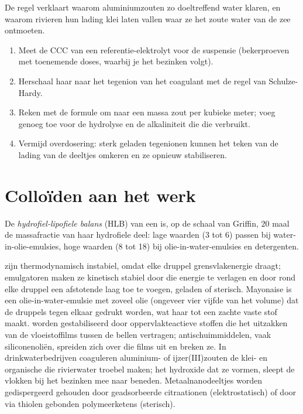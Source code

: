 De regel verklaart waarom aluminiumzouten zo doeltreffend water klaren,
en waarom rivieren hun lading klei laten vallen waar ze het zoute water
van de zee ontmoeten.

\begin{method}\label{met:b3:colloids:coagulant-dose}
\begin{enumerate}
  \item Meet de CCC van een referentie-elektrolyt voor de suspensie
        (bekerproeven met toenemende doses, waarbij je het bezinken
        volgt).
  \item Herschaal haar naar het tegenion van het coagulant met de regel
        van Schulze-Hardy.
  \item Reken met de formule om naar een massa zout per kubieke meter;
        voeg genoeg toe voor de hydrolyse en de alkaliniteit die die
        verbruikt.
  \item Vermijd overdosering: sterk geladen tegenionen kunnen het teken
        van de lading van de deeltjes omkeren en ze opnieuw
        stabiliseren.
\end{enumerate}
\end{method}

\section{Colloïden aan het werk}

\begin{definition}\label{def:b3:colloids:hlb}
De \emph{hydrofiel-lipofiele balans}
(HLB) van een  is, op de schaal van
Griffin, $20$ maal de
massafractie van haar hydrofiele deel: lage waarden (3 tot 6) passen bij
water-in-olie-emulsies, hoge waarden (8 tot 18) bij olie-in-water-emulsies
en detergenten.
\end{definition}

 zijn thermodynamisch instabiel, omdat elke druppel
grensvlakenergie draagt; emulgatoren maken ze kinetisch stabiel door die
energie te verlagen en door rond elke druppel een afstotende laag toe te
voegen, geladen of sterisch. Mayonaise is een olie-in-water-emulsie met
zoveel olie (ongeveer vier vijfde van het volume) dat de druppels tegen
elkaar gedrukt worden, wat haar tot een zachte vaste stof maakt. 
worden gestabiliseerd door oppervlakteactieve stoffen die het uitzakken
van de vloeistoffilms tussen de bellen vertragen; antischuimmiddelen,
vaak siliconenoliën, spreiden zich over die films uit en breken ze. In
drinkwaterbedrijven coaguleren aluminium- of ijzer(III)zouten de klei- en
organische  die rivierwater troebel maken; het hydroxide dat ze
vormen, sleept de vlokken bij het bezinken mee naar beneden.
Metaalnanodeeltjes worden gedispergeerd gehouden door geadsorbeerde
citraationen (elektrostatisch) of door via thiolen gebonden
polymeerketens (sterisch).

